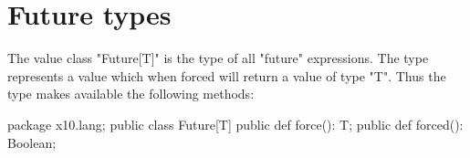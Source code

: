 \section{Future types}

The value class \xcd"Future[T]"
is the type of all \xcd"future" expressions.
The type represents a value which when forced will return a value of type
\xcd"T". Thus the type makes available the following methods:

\begin{xten}
package x10.lang;
public class Future[T] {
  public def force(): T;
  public def forced(): Boolean;
}
\end{xten}
  
